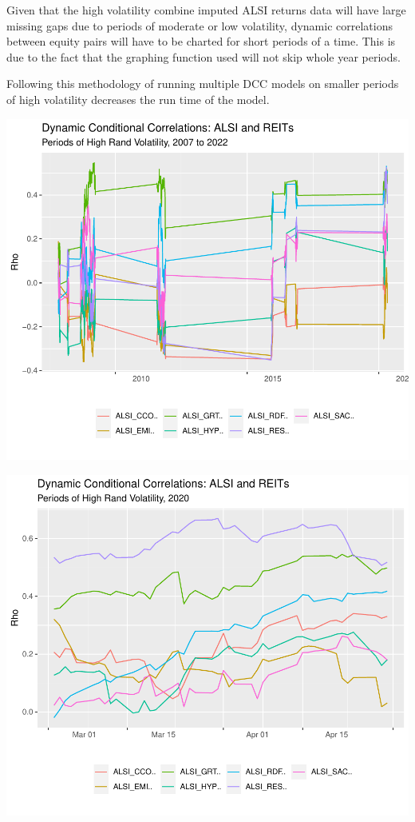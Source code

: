 \documentclass[11pt,preprint, authoryear]{elsarticle}
\let\origfigure\figure
\let\endorigfigure\endfigure
\renewenvironment{figure}[1][2] {
    \expandafter\origfigure\expandafter[H]
} {
    \endorigfigure
}
\numberwithin{equation}{section}
\numberwithin{figure}{section}
\numberwithin{table}{section}
\begin{document}
Given that the high volatility combine imputed ALSI returns data will
have large missing gaps due to periods of moderate or low volatility,
dynamic correlations between equity pairs will have to be charted for
short periods of a time. This is due to the fact that the graphing
function used will not skip whole year periods.

Following this methodology of running multiple DCC models on smaller
periods of high volatility decreases the run time of the model.

\begin{figure}
\centering
\includegraphics{Fin_Metrics_Project_files/figure-latex/unnamed-chunk-6-1.pdf}
\caption{Dynamic Conditional Correlations Graph}
\end{figure}

\begin{figure}
\centering
\includegraphics{Fin_Metrics_Project_files/figure-latex/unnamed-chunk-8-1.pdf}
\caption{Dynamic Conditional Correlations Graph}
\end{figure}
\end{document}
